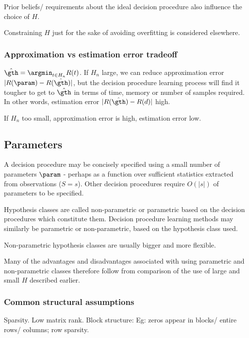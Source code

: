 \documentclass[oneside, article]{memoir}
\begin{document}
Prior beliefs/ requirements about the ideal decision procedure also influence the choice of $H$.

Constraining $H$ just for the sake of avoiding overfitting is considered elsewhere.

\subsubsection{Approximation vs estimation error tradeoff}
$\hat{\gth} = \argmin_{t\in H_n} R(t)$. If $H_n$ large, we can reduce approximation error $|R(\param) - R(\hat{\gth})|$, but the decision procedure learning process will find it tougher to get to $\hat{\gth}$ in terms of time, memory or number of samples required. In other words, estimation error $|R(\hat{\gth}) - R(d)|$ high. 

If $H_n$ too small, approximation error is high, estimation error low. 

\subsection{Parameters}
A decision procedure may be concisely specified using a small number of parameters $\param$ - perhaps as a function over sufficient statistics extracted from observations ($S =s$). Other decision procedures require $O(|s|)$ of parameters to be specified.

Hypothesis classes are called non-parametric or parametric based on the decision procedures which constitute them. Decision procedure learning methods may similarly be parametric or non-parametric, based on the hypothesis class used.

Non-parametric hypothesis classes are usually bigger and more flexible.

Many of the advantages and disadvantages associated with using parametric and non-parametric classes therefore follow from comparison of the use of large and small $H$ described earlier.

\subsubsection{Common structural assumptions}
Sparsity. Low matrix rank. Block structure: Eg: zeros appear in blocks/ entire rows/ columns; row sparsity.
\end{document}
